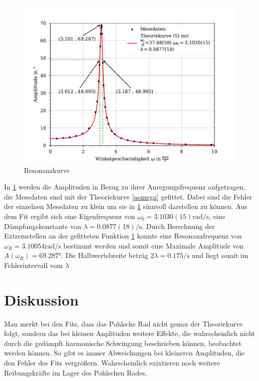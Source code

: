 \documentclass[11pt, a4paper]{article}
\begin{document}
	\begin{figure}[h]
        \centering
        \includegraphics[width=\textwidth]{./10Plot.pdf}

        \caption{Resonanzkurve}
        \label{fig:Resonanzkurve}
    \end{figure}
    In \ref{fig:Resonanzkurve} werden die Amplituden in Bezug zu ihrer Anregungsfrequenz aufgetragen, die Messdaten sind
    mit der Theoriekurve \ref{aomega} gefittet. Dabei sind die Fehler der einzelnen Messdaten zu klein um sie in \ref{fig:Resonanzkurve}
    sinnvoll darstellen zu können. Aus dem Fit ergibt sich eine Eigenfrequenz von $\omega_0=3.1030(15) \si{\radian\per\second}$, eine Dämpfungskonstante
    von $\lambda=0.0877(18) \si{\per\second}$. Durch Berechnung der Extremstellen an der gefitteten Funktion \ref{fig:Resonanzkurve} konnte eine Resonanzfrequenz
    von $\omega_R=3.10054 \si{\radian\per\second}$ bestimmt werden und somit eine Maximale Amplitude von $A(\omega_R)=69.287 \si{\degree}$.
    Die Halbwertsbreite beträg $2\lambda=0.175 \si{\per\second}$ und liegt somit im Fehlerintervall vom $\lambda$
	
    \section{Diskussion}

    Man merkt bei den Fits, dass das Pohlsche Rad nicht genau der Theoriekurve folgt, sondern das bei kleinen Anplituden
    weitere Effekte, die wahrscheinlich nicht durch die gedämpft harmonische Schwingung beschrieben können, beobachtet werden können.
    So gibt es immer Abweichungen bei kleineren Amplituden, die den Fehler des Fits vergrößern. Wahrscheinlich exixtieren noch weitere
    Reibungskräfte im Lager des Pohlschen Rades. \\
\end{document}
